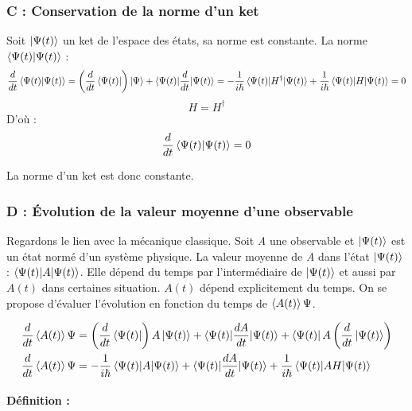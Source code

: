 \documentclass[12pt,a4paper,titlepage]{book}
\begin{document}
\subsubsection{C : Conservation de la norme d'un ket}
Soit $\ket{\Psi (t)}$ un ket de l'espace des états, sa norme est constante. La norme $\braket{\Psi (t) | \Psi (t)}$ :
\begin{equation*}
\frac{d}{dt} \braket{\Psi (t) | \Psi (t)} = \left( \frac{d}{dt} \bra{\Psi (t)} \right) \ket\Psi + \braket{\Psi (t) | \frac{d}{dt} | \Psi (t)} = -\frac{1}{i \hbar} \braket{\Psi (t) |H^\dagger | \Psi (t)} + \frac{1}{i \hbar} \braket{\Psi (t) |H| \Psi (t)} = 0
\end{equation*}
\begin{equation*}
H = H^\dagger
\end{equation*}
D'où :
\begin{equation*}
\frac{d}{dt} \braket{\Psi (t) | \Psi (t)} = 0
\end{equation*}

La norme d'un ket est donc constante.

\subsubsection{D : Évolution de la valeur moyenne d'une observable}
Regardons le lien avec la mécanique classique. Soit \textit{A} une observable et $\ket{\Psi (t)}$ est un état normé d'un système physique. La valeur moyenne de \textit{A} dans l'état $\ket{\Psi (t)}$ : $\braket{\Psi (t) |A| \Psi (t)}$. Elle dépend du temps par l'intermédiaire de $\ket{\Psi (t)}$ et aussi par $A(t)$ dans certaines situation. $A(t)$ dépend explicitement du temps. On se propose d'évaluer l'évolution en fonction du temps de $\braket{A(t)} \Psi$.

\begin{align*}
\frac{d}{dt} \braket{A(t)} \Psi &= \left(\frac{d}{dt} \bra{\Psi (t)} \right) A \ket{\Psi (t)} + \braket{\Psi (t) | \frac{dA}{dt} | \Psi (t)} + \bra{\Psi (t)} A \left( \frac{d}{dt} \ket{\Psi (t)} \right)\\
\frac{d}{dt} \braket{A(t)} \Psi &= - \frac{1}{i \hbar} \braket{\Psi (t) |A| \Psi (t)} + \braket{\Psi (t) |\frac{dA}{dt}| \Psi (t)} + \frac{1}{i \hbar} \braket{\Psi (t) |AH| \Psi (t)}
\end{align*}

\paragraph*{Définition :}
\end{document}
